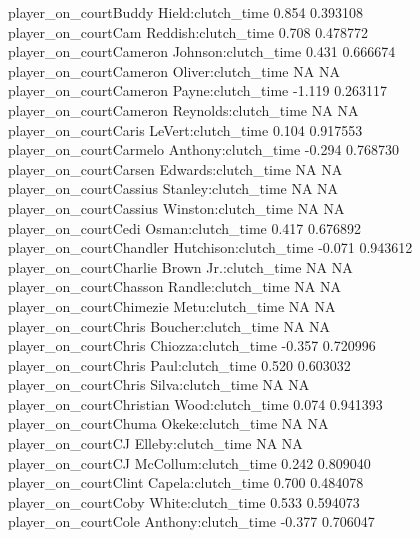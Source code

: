\documentclass[
  landscape]{article}
\begin{document}
{player\_on\_courtBuddy Hield:clutch\_time 0.854 0.393108\\
player\_on\_courtCam Reddish:clutch\_time 0.708 0.478772\\
player\_on\_courtCameron Johnson:clutch\_time 0.431 0.666674\\
player\_on\_courtCameron Oliver:clutch\_time NA NA\\
player\_on\_courtCameron Payne:clutch\_time -1.119 0.263117\\
player\_on\_courtCameron Reynolds:clutch\_time NA NA\\
player\_on\_courtCaris LeVert:clutch\_time 0.104 0.917553\\
player\_on\_courtCarmelo Anthony:clutch\_time -0.294 0.768730\\
player\_on\_courtCarsen Edwards:clutch\_time NA NA\\
player\_on\_courtCassius Stanley:clutch\_time NA NA\\
player\_on\_courtCassius Winston:clutch\_time NA NA\\
player\_on\_courtCedi Osman:clutch\_time 0.417 0.676892\\
player\_on\_courtChandler Hutchison:clutch\_time -0.071 0.943612\\
player\_on\_courtCharlie Brown Jr.:clutch\_time NA NA\\
player\_on\_courtChasson Randle:clutch\_time NA NA\\
player\_on\_courtChimezie Metu:clutch\_time NA NA\\
player\_on\_courtChris Boucher:clutch\_time NA NA\\
player\_on\_courtChris Chiozza:clutch\_time -0.357 0.720996\\
player\_on\_courtChris Paul:clutch\_time 0.520 0.603032\\
player\_on\_courtChris Silva:clutch\_time NA NA\\
player\_on\_courtChristian Wood:clutch\_time 0.074 0.941393\\
player\_on\_courtChuma Okeke:clutch\_time NA NA\\
player\_on\_courtCJ Elleby:clutch\_time NA NA\\
player\_on\_courtCJ McCollum:clutch\_time 0.242 0.809040\\
player\_on\_courtClint Capela:clutch\_time 0.700 0.484078\\
player\_on\_courtCoby White:clutch\_time 0.533 0.594073\\
player\_on\_courtCole Anthony:clutch\_time -0.377 0.706047\\
}
\end{document}
